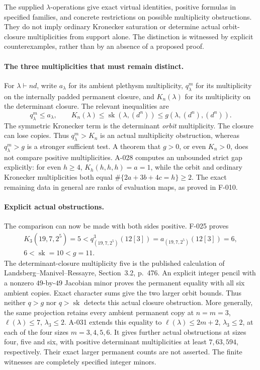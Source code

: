 \documentclass[11pt]{article}
\begin{document}
The supplied \(\lambda\)-operations give exact virtual identities,
positive formulas in specified families, and concrete restrictions on
possible multiplicity obstructions. They do not imply ordinary
Kronecker saturation or determine actual orbit-closure multiplicities
from support alone. The distinction is witnessed by explicit
counterexamples, rather than by an absence of a proposed proof.

\paragraph{The three multiplicities that must remain distinct.}
For \(\lambda\vdash nd\), write \(a_\lambda\) for its ambient
plethysm multiplicity, \(q^m_\lambda\) for its multiplicity on the
internally padded permanent closure, and \(K_n(\lambda)\) for
its multiplicity on the determinant closure. The relevant inequalities
are
\[
 q^m_\lambda\leq a_\lambda,\qquad
 K_n(\lambda)\leq\operatorname{sk}(\lambda,(d^n))
                         \leq g(\lambda,(d^n),(d^n)).
\]
The symmetric Kronecker term is the determinant \emph{orbit}
multiplicity. The closure can lose copies. Thus \(q^m_\lambda>K_n\)
is an actual multiplicity obstruction, whereas \(q^m_\lambda>g\)
is a stronger sufficient test. A theorem that \(g>0\), or even
\(K_n>0\), does not compare positive multiplicities. A-028 computes an unbounded strict gap explicitly: for even \(h\geq4\),
\(K_h(h,h,h)=a=1\), while the orbit and ordinary Kronecker
multiplicities both equal \(\#\{2a+3b+4c=h\}\geq2\).
The exact remaining data in general are ranks of evaluation maps,
as proved in F-010.

\paragraph{Explicit actual obstructions.}
The comparison can now be made with both sides positive. F-025 proves
\[
 \begin{gathered}
 K_3(19,7,2^5)=5
 <q^3_{(19,7,2^5)}(12[3])=a_{(19,7,2^5)}(12[3])=6,\\
 6<\operatorname{sk}=10<g=11.
 \end{gathered}
\]
The determinant-closure multiplicity five is the published calculation
of Landsberg--Manivel--Ressayre, Section~3.2, p.~476. An explicit
integer pencil with a nonzero \(49\)-by-\(49\) Jacobian minor proves
the permanent equality with all six ambient copies. Exact character
sums give the two larger orbit bounds. Thus neither \(q>g\) nor
\(q>\operatorname{sk}\) detects this actual closure obstruction.
More generally, the same projection retains every ambient permanent
copy at \(n=m=3\), \(\ell(\lambda)\leq7\), \(\lambda_3\leq2\).
A-031 extends this equality to \(\ell(\lambda)\leq2m+2\),
\(\lambda_3\leq2\), at each of the four sizes \(m=3,4,5,6\).
It gives further actual obstructions at sizes four, five and six,
with positive determinant multiplicities at least \(7,63,594\),
respectively. Their exact larger permanent counts are not asserted.
The finite witnesses are completely specified integer minors.
\end{document}

